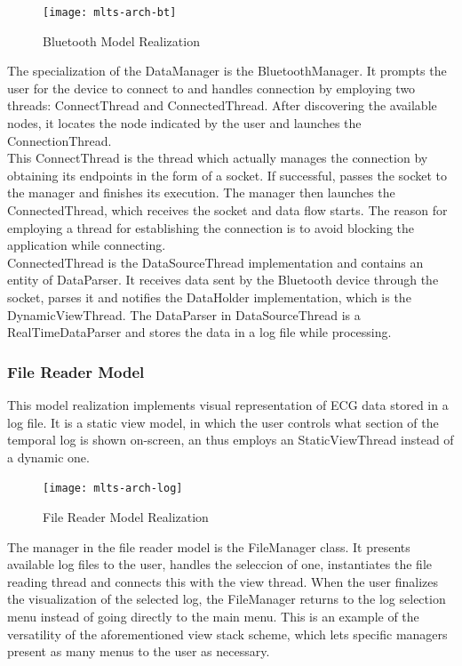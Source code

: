 			\begin{figure}[h]
			\centering
		    	\texttt{[image: mlts-arch-bt]}
	  		\caption{Bluetooth Model Realization}
			\label{fig:arch-bt}
			\end{figure}

			The specialization of the DataManager is the BluetoothManager. It prompts the user for the device to connect to and handles connection by employing two threads: ConnectThread and ConnectedThread. After discovering the available nodes, it locates the node indicated by the user and launches the ConnectionThread.\\

			This ConnectThread is the thread which actually manages the connection by obtaining its endpoints in the form of a socket. If successful, passes the socket to the manager and finishes its execution. The manager then launches the ConnectedThread, which receives the socket and data flow starts. The reason for employing a thread for establishing the connection is to avoid blocking the application while connecting.\\

			ConnectedThread is the DataSourceThread implementation and contains an entity of DataParser. It receives data sent by the Bluetooth device through the socket, parses it and notifies the DataHolder implementation, which is the DynamicViewThread. The DataParser in DataSourceThread is a RealTimeDataParser and stores the data in a log file while processing.

		\subsubsection{File Reader Model}
			This model realization implements visual representation of ECG data stored in a log file. It is a static view model, in which the user controls what section of the temporal log is shown on-screen, an thus employs an StaticViewThread instead of a dynamic one.\\

			\begin{figure}[h]
			\centering
		    	\texttt{[image: mlts-arch-log]}
	  		\caption{File Reader Model Realization}
			\label{fig:arch-log}
			\end{figure}
		
			The manager in the file reader model is the FileManager class. It presents available log files to the user, handles the seleccion of one, instantiates the file reading thread and connects this with the view thread. When the user finalizes the visualization of the selected log, the FileManager returns to the log selection menu instead of going directly to the main menu. This is an example of the versatility of the aforementioned view stack scheme, which lets specific managers present as many menus to the user as necessary.\\

